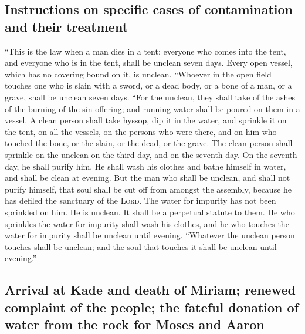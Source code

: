 \hypertarget{instructions-on-specific-cases-of-contamination-and-their-treatment}{%
\subsection{Instructions on specific cases of contamination and their
treatment}\label{instructions-on-specific-cases-of-contamination-and-their-treatment}}

 ``This is the law when a man dies in a tent: everyone
who comes into the tent, and everyone who is in the tent, shall be
unclean seven days.  Every open vessel, which has no
covering bound on it, is unclean.  ``Whoever in the open
field touches one who is slain with a sword, or a dead body, or a bone
of a man, or a grave, shall be unclean seven days.  ``For
the unclean, they shall take of the ashes of the burning of the sin
offering; and running water shall be poured on them in a vessel.
 A clean person shall take hyssop, dip it in the water,
and sprinkle it on the tent, on all the vessels, on the persons who were
there, and on him who touched the bone, or the slain, or the dead, or
the grave.  The clean person shall sprinkle on the
unclean on the third day, and on the seventh day. On the seventh day, he
shall purify him. He shall wash his clothes and bathe himself in water,
and shall be clean at evening.  But the man who shall be
unclean, and shall not purify himself, that soul shall be cut off from
amongst the assembly, because he has defiled the sanctuary of the
\textsc{Lord}. The water for impurity has not been sprinkled on him. He
is unclean.  It shall be a perpetual statute to them. He
who sprinkles the water for impurity shall wash his clothes, and he who
touches the water for impurity shall be unclean until evening.
 ``Whatever the unclean person touches shall be unclean;
and the soul that touches it shall be unclean until evening.''

\hypertarget{arrival-at-kade-and-death-of-miriam-renewed-complaint-of-the-people-the-fateful-donation-of-water-from-the-rock-for-moses-and-aaron}{%
\subsection{Arrival at Kade and death of Miriam; renewed complaint of
the people; the fateful donation of water from the rock for Moses and
Aaron}\label{arrival-at-kade-and-death-of-miriam-renewed-complaint-of-the-people-the-fateful-donation-of-water-from-the-rock-for-moses-and-aaron}}

